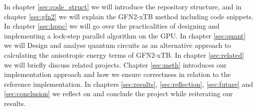 In chapter \ref{sec:code_struct} we will introduce the repository structure, and in chapter \ref{sec:gfn2} we will explain the GFN2-xTB method including code snippets. In chapter \ref{sec:hppc} we will go over the practicalities of designing and implementing a lock-step parallel algorithm on the GPU. In chapter \ref{sec:quant} we will Design and analyse quantum circuits as an alternative approach to calculating the anisotropic energy terms of GFN2-xTB. In chapter \ref{sec:related} we will briefly discuss related projects. Chapter \ref{sec:meth} introduces our implementation approach and how we ensure correctness in relation to the reference implementation. In chapters \ref{sec:results}, \ref{sec:reflection}, \ref{sec:future} and \ref{sec:conclusion} we reflect on and conclude the project while reiterating our results.
